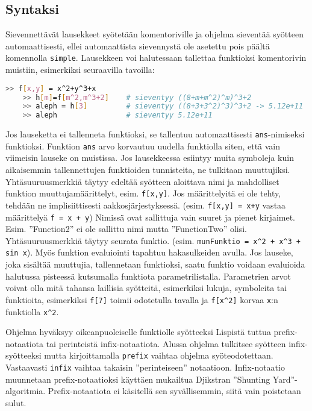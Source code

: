 \documentclass[10pt,a4paper]{article}
\begin{document}
\subsection{Syntaksi}
Sievennettävät lausekkeet syötetään komentoriville ja ohjelma sieventää syötteen automaattisesti, ellei
automaattista sievennystä ole asetettu pois päältä komennolla \texttt{simple}. Lausekkeen voi halutessaan
tallettaa funktioksi komentorivin muistiin, esimerkiksi seuraavilla tavoilla:
\begin{lstlisting}[language=bash]
    >> f[x,y] = x^2+y^3+x
    >> h[m]=f[m^2,m^3+2]	# sieventyy ((8+m+m^2)^m)^3+2
    >> aleph = h[3]			# sieventyy ((8+3+3^2)^3)^3+2 -> 5.12e+11
    >> aleph				# sieventyy 5.12e+11
\end{lstlisting}
Jos lauseketta ei tallenneta funktioksi, se tallentuu automaattisesti \texttt{ans}-nimiseksi funktioksi.
Funktion \texttt{ans} arvo korvautuu uudella funktiolla siten, että vain viimeisin lauseke on muistissa.
Jos lausekkeessa esiintyy muita symboleja kuin aikaisemmin tallennettujen funktioiden tunnisteita,
ne tulkitaan muuttujiksi. Yhtäsuuruusmerkkiä täytyy edeltää syötteen aloittava nimi ja mahdolliset funktion muuttujamäärittelyt, esim. \lstinline!f[x,y]!. Jos määrittelyitä ei ole tehty, tehdään ne implisiittisesti aakkosjärjestyksessä. (esim. \lstinline!f[x,y] = x+y! vastaa määrittelyä \lstinline!f = x + y!) Nimissä ovat sallittuja vain suuret ja pienet kirjaimet. Esim. ''Function2'' ei ole sallittu nimi mutta ''FunctionTwo'' olisi. Yhtäsuuruusmerkkiä täytyy seurata funktio. (esim. \lstinline!munFunktio = x^2 + x^3 + sin x!). Myös funktion evaluiointi tapahtuu hakasulkeiden avulla. Jos lauseke, joka sisältää muuttujia, tallennetaan funktioksi, saatu funktio voidaan evaluioida halutussa pisteessä kutsumalla funktiota parametrilistalla.  Parametrien arvot voivat olla mitä tahansa laillisia syötteitä, esimerkiksi lukuja, symboleita tai funktioita, esimerkiksi \lstinline!f[7]! toimii odotetulla tavalla ja \lstinline!f[x^2]! korvaa \lstinline!x!:n funktiolla \lstinline!x^2!. 

Ohjelma hyväksyy oikeanpuoleiselle funktiolle syötteeksi Lispistä tuttua prefix- notaatiota tai perinteistä infix-notaatiota. Alussa ohjelma tulkitsee syötteen infix-syötteeksi mutta kirjoittamalla \lstinline!prefix! vaihtaa ohjelma syöteodotettaan. Vastaavasti \lstinline!infix! vaihtaa takaisin ''perinteiseen'' notaatioon. Infix-notaatio muunnetaan prefix-notaatioksi käyttäen mukailtua Djikstran ''Shunting Yard''-algoritmia. Prefix-notaatiota ei käsitellä sen syvällisemmin, siitä vain poistetaan sulut. 
\end{document}
